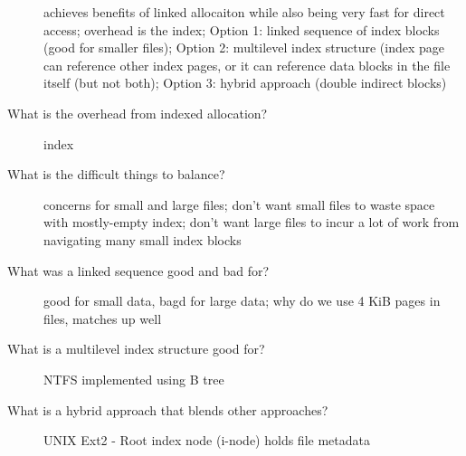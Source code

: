 \documentclass[10pt]{article}
\begin{document}
\begin{description}
  achieves benefits of linked allocaiton while also being very fast for direct access;
  overhead is the index;
  Option 1: linked sequence of index blocks (good for smaller files);
  Option 2: multilevel index structure (index page can reference other index pages, or it can reference data blocks in the file itself (but not both);
  Option 3: hybrid approach (double indirect blocks)
\item[What is the overhead from indexed allocation?]
  index
\item[What is the difficult things to balance?]
  concerns for small and large files;
  don't want small files to waste space with mostly-empty index;
  don't want large files to incur a lot of work from navigating many small index blocks
\item[What was a linked sequence good and bad for?]
  good for small data, bagd for large data;
  why do we use 4 KiB pages in files, matches up well
\item[What is a multilevel index structure good for?]
  NTFS implemented using B tree
\item[What is a hybrid approach that blends other approaches?]
  UNIX Ext2 - Root index node (i-node) holds file metadata
\end{description}
\end{document}
